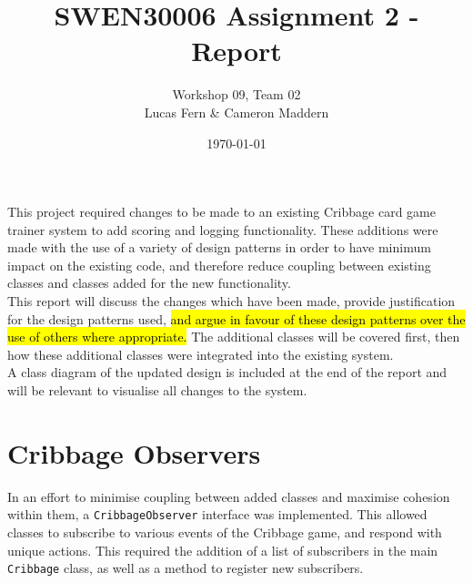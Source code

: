 \documentclass{article}
\title{SWEN30006 Assignment 2 - Report}
\date{\today}
\author{Workshop 09, Team 02\\Lucas Fern \& Cameron Maddern}
\begin{document}
\maketitle
This project required changes to be made to an existing Cribbage card game trainer system to add scoring and logging functionality. These additions were made with the use of a variety of design patterns in order to have minimum impact on the existing code, and therefore reduce coupling between existing classes and classes added for the new functionality.\\[2mm]
This report will discuss the changes which have been made, provide justification for the design patterns used, \hl{and argue in favour of these design patterns over the use of others where appropriate.} The additional classes will be covered first, then how these additional classes were integrated into the existing system.\\[2mm]
A class diagram of the updated design is included at the end of the report and will be relevant to visualise all changes to the system.

\section{Cribbage Observers}
In an effort to minimise coupling between added classes and maximise cohesion within them, a \verb|CribbageObserver| interface was implemented. This allowed classes to subscribe to various events of the Cribbage game, and respond with unique actions. This required the addition of a list of subscribers in the main \verb|Cribbage| class, as well as a method to register new subscribers.
\end{document}
